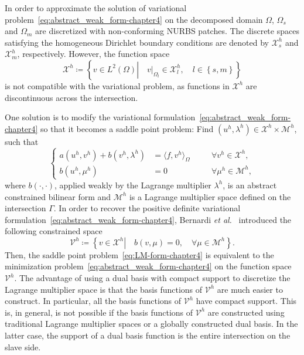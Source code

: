 In order to approximate the solution of variational problem~\eqref{eq:abstract_weak_form-chapter4} on the decomposed domain $\Omega$, $\Omega_s$ and $\Omega_m$ are discretized with non-conforming NURBS patches. The discrete spaces satisfying the homogeneous Dirichlet boundary conditions are denoted by $\mathcal{X}_s^h$ and $\mathcal{X}_m^h$, respectively. However, the function space
\begin{equation}
	\mathcal{X}^h\coloneqq \left\{ v\in L^2(\Omega) \left| \quad v\vert_{\Omega_l}\in\mathcal{X}_l^h,\quad l\in\left\{ s,m \right\} \right. \right\}
\end{equation}
is not compatible with the variational problem, as functions in $\mathcal{X}^h$ are discontinuous across the intersection.\par
One solution is to modify the variational formulation~\eqref{eq:abstract_weak_form-chapter4} so that it becomes a saddle point problem: Find $(u^h,\lambda^h)\in\mathcal{X}^h\times\mathcal{M}^h$, such that
\begin{equation}\label{eq:LM-form-chapter4}
	\left\{\begin{alignedat}{2}
		a(u^h, v^h)+b(v^h,\lambda^h)&=\langle f,v^h \rangle_\Omega\quad &&\forall{}v^h\in\mathcal{X}^h,\\
		b(u^h, \mu^h)&=0\quad &&\forall{}\mu^h\in\mathcal{M}^h,
	\end{alignedat}\right.
\end{equation}
where $b(\cdot,\cdot)$, applied weakly by the Lagrange multiplier $\lambda^h$, is an abstract constrained bilinear form and $\mathcal{M}^h$ is a Lagrange multiplier space defined on the intersection $\Gamma$. In order to recover the positive definite variational formulation~\eqref{eq:abstract_weak_form-chapter4}, Bernardi \textit{et al.}~\cite{bernardi_domain_1993} introduced the following constrained space
\begin{equation}
	\mathcal{V}^h\coloneqq \left\{ v\in \mathcal{X}^h \left| \quad b(v, \mu)=0,\quad \forall \mu\in \mathcal{M}^h \right. \right\}.
\end{equation}
Then, the saddle point problem~\eqref{eq:LM-form-chapter4} is equivalent to the minimization problem~\eqref{eq:abstract_weak_form-chapter4} on the function space $\mathcal{V}^h$. The advantage of using a dual basis with compact support to discretize the Lagrange multiplier space is that the basis functions of $\mathcal{V}^h$ are much easier to construct. In particular, all the basis functions of $\mathcal{V}^h$ have compact support. This is, in general, is not possible if the basis functions of $\mathcal{V}^h$ are constructed using traditional Lagrange multiplier spaces or a globally constructed dual basis. In the latter case, the support of a dual basis function is the entire intersection on the slave side.

